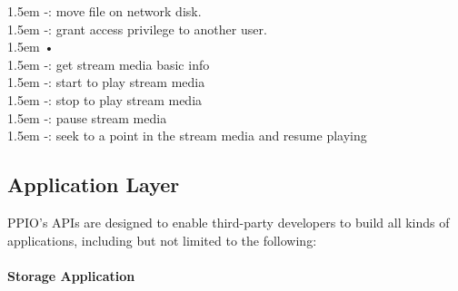 \documentclass[10pt,a4paper]{article}
\begin{document}
\hangindent 1.5em
\noindent   
-: move file on network disk.
  \vspace{-0.8em}
\\

\hangindent 1.5em
\noindent   
-: grant access privilege to another user.  
  \vspace{-0.5em}
\\

\hangindent 1.5em
\noindent   
•
  \vspace{-0.8em}
\\

\hangindent 1.5em
\noindent   
-: get stream media basic info
  \vspace{-0.8em}
\\

\hangindent 1.5em
\noindent   
-: start to play stream media
  \vspace{-0.8em}
\\

\hangindent 1.5em
\noindent   
-: stop to play stream media
  \vspace{-0.8em}
\\

\hangindent 1.5em
\noindent   
-: pause stream media
  \vspace{-0.8em}
\\

\hangindent 1.5em
\noindent   
-: seek to a point in the stream media and resume playing
  \vspace{-0.5em}

        \subsection{Application Layer}  %
PPIO’s APIs are designed to enable third-party developers to build all kinds of applications, including but not limited to the following:
  \vspace{-0.5em}
 \\\\{\bf Storage Application}
   \vspace{-0.8em}
\\
\end{document}
